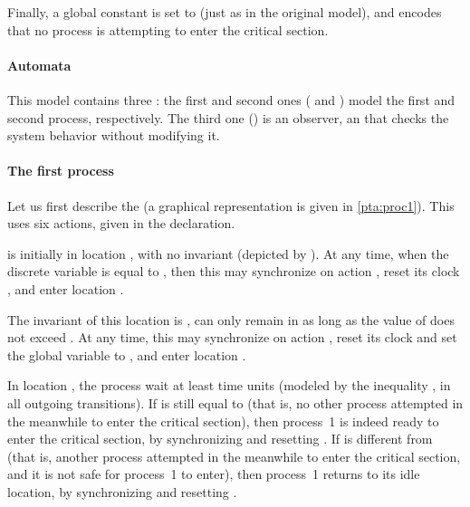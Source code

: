 Finally, a global constant  is set to  (just as in the original \pat{} model), and encodes that no process is attempting to enter the critical section.





\paragraph{Automata}
This model contains three \IPTA{}:
the first and second ones ( and ) model the first and second process, respectively. The third one () is an observer, \ie{} an \IPTA{} that checks the system behavior without modifying it.

\paragraph{The first process}
Let us first describe the \IPTA{}  (a graphical representation is given in \cref{pta:proc1}).
This \IPTA{} uses six actions, given in the  declaration.

 is initially in location , with no invariant (depicted by ).
At any time, when the discrete variable  is equal to , then this \IPTA{} may synchronize on action , reset its clock , and enter location .

The invariant of this location is , \ie{}  can only remain in  as long as the value of  does not exceed .
At any time, this \IPTA{} may synchronize on action , reset its clock  and set the global variable  to , and enter location .

In location , the process wait at least  time units (modeled by the inequality , in all outgoing transitions).
If  is still equal to  (that is, no other process attempted in the meanwhile to enter the critical section), then process~1 is indeed ready to enter the critical section, by synchronizing  and resetting .
If  is different from  (that is, another process attempted in the meanwhile to enter the critical section, and it is not safe for process~1 to enter), then process~1 returns to its idle location, by synchronizing  and resetting .

